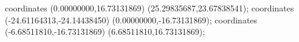  coordinates {(0.00000000,16.73131869) (25.29835687,23.67838541)};
 coordinates {(-24.61164313,-24.14438450) (0.00000000,-16.73131869)};
 coordinates {(-6.68511810,-16.73131869) (6.68511810,16.73131869)};
